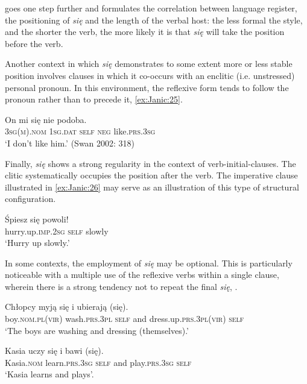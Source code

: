 \documentclass[output=paper]{langscibook}
\begin{document}
\citet{Swan2002} goes one step further and formulates the correlation between language register, the positioning of \textit{się} and the length of the verbal host: the less formal the style, and the shorter the verb, the more likely it is that \textit{się} will take the position before the verb.

Another context in which \textit{się} demonstrates to some extent more or less stable position involves clauses in which it co-occurs with an enclitic (i.e. unstressed) personal pronoun. In this environment, the reflexive form tends to follow the pronoun rather than to precede it, \ref{ex:Janic:25}.

\ea \label{ex:Janic:25}
\gll On	 mi	 się	 nie	 podoba.\\
	 \textsc{3sg(m).nom}	 \textsc{1sg.dat}	\textsc{self}	\textsc{neg}	like.\textsc{prs.3sg}	\\
\glt ‘I don’t like him.’ (Swan 2002: 318)
\z 
	
Finally, \textit{się} shows a strong regularity in the context of verb-initial-clauses. The clitic systematically occupies the position after the verb. The imperative clause illustrated in \ref{ex:Janic:26} may serve as an illustration of this type of structural configuration.

\ea \label{ex:Janic:26}
\gll Śpiesz	 	 się	 powoli!\\
	 hurry.up.\textsc{imp.2sg}	\textsc{self}	slowly\\
\glt ‘Hurry up slowly.’					
\z 

In some contexts, the employment of \textit{się} may be optional. This is particularly noticeable with a multiple use of the reflexive verbs within a single clause, wherein there is a strong tendency not to repeat the final \textit{się}, .

\ea \label{ex:Janic:27}
\ea \label{ex:Janic:27a}
\gll Chłopcy	 	 myją		 się	 i	 ubierają		 (się).\\
		boy.\textsc{nom.pl(vir)}	 wash.\textsc{prs.3pl}	\textsc{self}	and	 dress.up.\textsc{prs.3pl(vir)}	\textsc{self}\\
\glt ‘The boys are washing and dressing (themselves).’

\ex \label{ex:Janic:27b}
\gll Kasia		 uczy		 się	 i	bawi		 (się).	\\
		Kasia.\textsc{nom}	learn.\textsc{prs.3sg}	\textsc{self}	and	play.\textsc{prs.3sg}	\textsc{self}\\
\glt ‘Kasia learns and plays’.	\citep[60]{Bielec1998}
\z 
\z 
	
\end{document}
